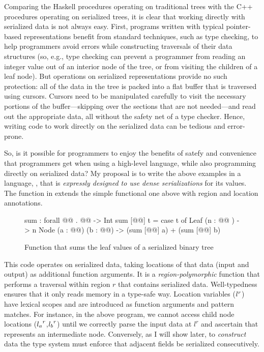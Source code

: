 Comparing the Haskell procedures operating on traditional trees with the C++
procedures operating on serialized trees, it is clear that working directly with
serialized data is not always easy. First, programs written with typical
pointer-based representations benefit from standard techniques, such as type
checking, to help programmers avoid errors while constructing traversals of
their data structures (so, e.g., type checking can prevent a programmer from
reading an integer value out of an interior node of the tree, or from visiting
the children of a leaf node). But operations on serialized representations
provide no such protection: all of the data in the tree is packed into a flat
buffer that is traversed using cursors. Cursors need to be manipulated carefully
to visit the necessary portions of the buffer---skipping over the sections that
are not needed---and read out the appropriate data, all without the safety net
of a type checker. Hence, writing code to work directly on the serialized data
can be tedious and error-prone.

So, is it possible for programmers to enjoy the benefits of satefy and
convenience that programmers get when using a high-level language, while also
programming directly on serialized data?
%
My proposal is to write the above examples in a language,
\emph{\ourcalc}, that is \emph{expressly designed to use dense serializations}
for its values. The \ourcalc{}  function in 
extends the simple functional one above with region and location annotations.

\begin{figure}
\begin{code}
sum : forall @@ . @@ -> Int
sum [@@] t = case t of
              Leaf (n : @@ ) -> n
              Node (a : @@) (b : @@)
               -> (sum [@@] a) + (sum [@@] b)
\end{code}
\caption{Function that sums the leaf values of a serialized binary tree}
\label{fig:gibbon_sumtree}
\end{figure}


This code operates on serialized data, taking locations of that data (input and
output) as additional function arguments.  It is a {\em region-polymorphic}
function that performs a traversal within region $r$ that contains serialized
data.  Well-typedness ensures that it only reads memory in a type-safe way.
%
Location variables (${l}^{r}$) have lexical scopes and are introduced as
function arguments and pattern matches.
%
For instance, in the above program, we cannot
access child node locations (${l_a}^{r}$,${l_b}^{r}$) until we correctly parse the input
data at $l^r$ and ascertain that represents an intermediate node.
%
Conversely, as I will show later, to \emph{construct} data the type system must
enforce that adjacent fields be serialized consecutively.

